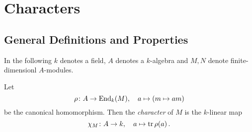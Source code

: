 \section{Characters}





\subsection{General Definitions and Properties}


\begin{conventions}
  In the following $k$ denotes a field, $A$ denotes a $k$-algebra and $M, N$ denote finite-dimensionl $A$-modules.
\end{conventions}


\begin{definition}
  Let
  \[
            \rho
    \colon  A
    \to     \operatorname{End}_k(M),
    \quad   a
    \mapsto (m \mapsto am)
  \]
  be the canonical homomorphism.
  Then the \emph{character} of $M$ is the $k$-linear map
  \[
            \chi_M
    \colon  A
    \to     k,
    \quad   a
    \mapsto \operatorname{tr} \rho(a) \,.
  \]
\end{definition}


